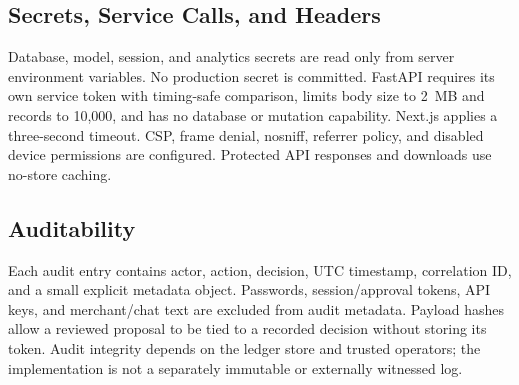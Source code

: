 \documentclass[conference,a4paper]{IEEEtran}
\begin{document}
\subsection{Secrets, Service Calls, and Headers}
Database, model, session, and analytics secrets are read only from server environment variables. No production secret is committed. FastAPI requires its own service token with timing-safe comparison, limits body size to 2~MB and records to 10,000, and has no database or mutation capability. Next.js applies a three-second timeout. CSP, frame denial, nosniff, referrer policy, and disabled device permissions are configured. Protected API responses and downloads use no-store caching.

\subsection{Auditability}
Each audit entry contains actor, action, decision, UTC timestamp, correlation ID, and a small explicit metadata object. Passwords, session/approval tokens, API keys, and merchant/chat text are excluded from audit metadata. Payload hashes allow a reviewed proposal to be tied to a recorded decision without storing its token. Audit integrity depends on the ledger store and trusted operators; the implementation is not a separately immutable or externally witnessed log.
\end{document}

